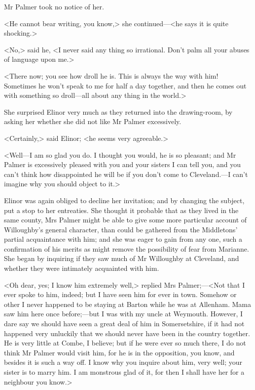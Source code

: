 Mr Palmer took no notice of her.

<He cannot bear writing, you know,> she continued—<he says it is quite shocking.>

<No,> said he, <I never said any thing so irrational. Don't palm all your abuses of language upon me.>

<There now; you see how droll he is. This is always the way with him! Sometimes he won't speak to me for half a day together, and then he comes out with something so droll—all about any thing in the world.>

She surprised Elinor very much as they returned into the drawing-room, by asking her whether she did not like Mr Palmer excessively.

<Certainly,> said Elinor; <he seems very agreeable.>

<Well—I am so glad you do. I thought you would, he is so pleasant; and Mr Palmer is excessively pleased with you and your sisters I can tell you, and you can't think how disappointed he will be if you don't come to Cleveland.—I can't imagine why you should object to it.>

Elinor was again obliged to decline her invitation; and by changing the subject, put a stop to her entreaties. She thought it probable that as they lived in the same county, Mrs Palmer might be able to give some more particular account of Willoughby's general character, than could be gathered from the Middletons' partial acquaintance with him; and she was eager to gain from any one, such a confirmation of his merits as might remove the possibility of fear from Marianne. She began by inquiring if they saw much of Mr Willoughby at Cleveland, and whether they were intimately acquainted with him.

<Oh dear, yes; I know him extremely well,> replied Mrs Palmer;—<Not that I ever spoke to him, indeed; but I have seen him for ever in town. Somehow or other I never happened to be staying at Barton while he was at Allenham. Mama saw him here once before;—but I was with my uncle at Weymouth. However, I dare say we should have seen a great deal of him in Somersetshire, if it had not happened very unluckily that we should never have been in the country together. He is very little at Combe, I believe; but if he were ever so much there, I do not think Mr Palmer would visit him, for he is in the opposition, you know, and besides it is such a way off. I know why you inquire about him, very well; your sister is to marry him. I am monstrous glad of it, for then I shall have her for a neighbour you know.>

